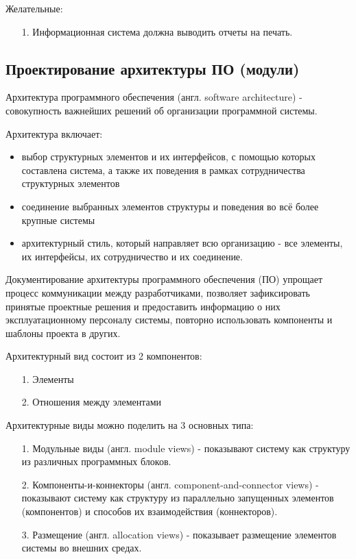 Желательные:

\begin{enumerate}
    \item [1.] Информационная система должна выводить отчеты на печать.
\end{enumerate}

\subsection{Проектирование архитектуры ПО (модули)}

Архитектура программного обеспечения (англ. software architecture) - совокупность важнейших решений об организации программной системы.

Архитектура включает:

\begin{itemize}
    \item выбор структурных элементов и их интерфейсов, с помощью которых составлена система, а также их поведения в рамках сотрудничества структурных элементов
    \item соединение выбранных элементов структуры и поведения во всё более крупные системы
    \item архитектурный стиль, который направляет всю организацию - все элементы, их интерфейсы, их сотрудничество и их соединение.
\end{itemize}

Документирование архитектуры программного обеспечения (ПО) упрощает процесс коммуникации между разработчиками, позволяет зафиксировать принятые проектные решения и предоставить информацию о них эксплуатационному персоналу системы, повторно использовать компоненты и шаблоны проекта в других.

Архитектурный вид состоит из 2 компонентов:

\begin{enumerate}
    \item [1.] Элементы
    \item [2.] Отношения между элементами
\end{enumerate}

Архитектурные виды можно поделить на 3 основных типа:

\begin{itemize}
    \item [1.] Модульные виды (англ. module views) - показывают систему как структуру из различных программных блоков.
    \item [2.] Компоненты-и-коннекторы (англ. component-and-connector views) - показывают систему как структуру из параллельно запущенных элементов (компонентов) и способов их взаимодействия (коннекторов).
    \item [3.] Размещение (англ. allocation views) - показывает размещение элементов системы во внешних средах.
\end{itemize}

